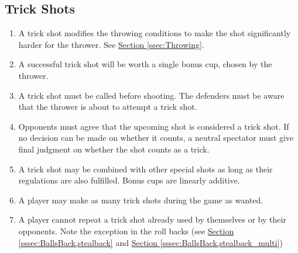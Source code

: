 	\subsection{Trick Shots}\label{ssec:TrickShots}
        \begin{enumerate}[label=(\roman*)]
            \item \label{sssec:trickShots,deff} A trick shot modifies the throwing conditions to make the shot significantly harder for the thrower.
                See \hyperref[ssec:Throwing]{Section \ref{ssec:Throwing}}.
            \item \label{sssec:TrickShots,numofcups} A successful trick shot will be worth a single bonus cup, chosen by the thrower.
            \item \label{sssec:TrickShots,calling} A trick shot must be called before shooting.
                The defenders must be aware that the thrower is about to attempt a trick shot.
            \item \label{sssec:TrickShot,agree} Opponents must agree that the upcoming shot is considered a trick shot.
                If no decision can be made on whether it counts, a neutral spectator must give final judgment on whether the shot counts as a trick.
            \item \label{sssec:TrickShot,combo} A trick shot may be combined with other special shots as long as their regulations are also fulfilled.
                Bonus cups are linearly additive. 
            \item \label{sssec:TrickShot,number} A player may make as many trick shots during the game as wanted.
            \item \label{sssec:TrickShot,repeat} A player cannot repeat a trick shot already used by themselves or by their opponents.
                Note the exception in the roll backs (see \hyperref[sssec:BallsBack,stealback]{Section \ref{sssec:BallsBack,stealback}} and \hyperref[sssec:BallsBack,stealback_multi]{Section \ref{sssec:BallsBack,stealback_multi}})
        \end{enumerate}
